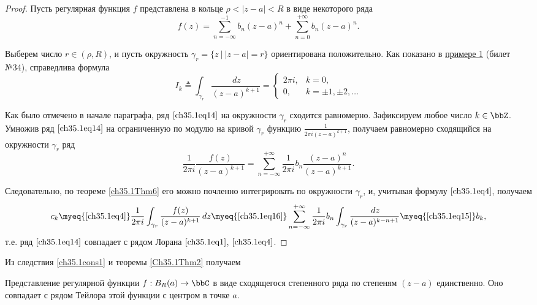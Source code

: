 \begin{proof}
Пусть регулярная функция $f$ представлена в кольце $\rho < |z - a| < R$ в виде некоторого ряда
\begin{equation} \label{ch35.1eq14}
f(z) = \sum_{n = -\infty}^{-1} b_n (z - a)^n + \sum_{n = 0}^{+\infty} b_n (z - a)^n.
\end{equation}

Выберем число $r \in (\rho, R)$, и пусть окружность $\gamma_r = \{ z \: \big| \: |z - a| = r\}$ ориентирована положительно. Как показано в \hyperref[exmpl1]{примере 1} (билет №34), справедлива формула
\begin{equation} \label{ch35.1eq15}
I_k \triangleq \int_{\gamma_r} \frac{\,dz}{(z - a)^{k + 1}} = 
\begin{cases}
2\pi i, & k = 0, \\
0, & k = \pm1, \pm2, \ldots
\end{cases}
\end{equation}

Как было отмечено в начале параграфа, ряд $\eqref{ch35.1eq14}$ на окружности $\gamma_r$ сходится равномерно. Зафиксируем любое число $k \in \bbZ$. Умножив ряд $\eqref{ch35.1eq14}$ на ограниченную по модулю на кривой $\gamma_r$ функцию $\frac{1}{2\pi i(z - a)^{k + 1}}$, получаем равномерно сходящийся на окружности $\gamma_r$ ряд
\begin{equation} \label{ch35.1eq16}
\frac{1}{2\pi i} \frac{f(z)}{(z - a)^{k + 1}} = \sum_{n = -\infty}^{+\infty} \frac{1}{2\pi i} b_n \frac{(z-a)^n}{(z - a)^{k + 1}}.
\end{equation}

Следовательно, по теореме \ref{ch35.1Thm6} его можно почленно интегрировать по окружности $\gamma_r$, и, учитывая формулу $\eqref{ch35.1eq4}$, получаем
$$
c_k \myeq{\eqref{ch35.1eq4}} \frac{1}{2\pi i} \int_{\gamma_r} \frac{f(z)}{(z - a)^{k + 1}} \,dz \myeq{\eqref{ch35.1eq16}} \sum_{n = -\infty}^{+\infty} \frac{1}{2\pi i} b_n \int_{\gamma_r} \frac{\,dz}{(z - a)^{k - n + 1}} \myeq{\eqref{ch35.1eq15}} b_k,
$$
т.е. ряд $\eqref{ch35.1eq14}$ совпадает с рядом Лорана $\eqref{ch35.1eq1}$, $\eqref{ch35.1eq4}$.
\end{proof}

Из следствия \ref{ch35.1cons1} и теоремы \ref{Ch35.1Thm2} получаем

\begin{cons}
Представление регулярной функции $f : B_R(a) \to \bbC$ в виде сходящегося степенного ряда по степеням $(z - a)$ единственно. Оно совпадает с рядом Тейлора этой функции с центром в точке $a$.
\end{cons}

